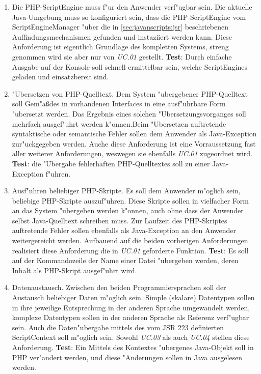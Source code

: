 \begin{enumerate}
\item Die PHP-ScriptEngine muss f"ur den Anwender verf"ugbar sein. Die aktuelle Java-Umgebung muss so konfiguriert sein,
    dass die PHP-ScriptEngine vom ScriptEngineManager "uber die in \ref{sec:javanscripts:jsr} beschriebenen Auffindungsmechanismen
    gefunden und instaziiert werden kann. Diese Anforderung ist eigentlich Grundlage des kompletten Systems, streng genommen wird sie
    aber nur von \emph{UC.01} gestellt.
    \textbf{Test}: Durch einfache Ausgabe auf der Konsole soll schnell ermittelbar sein, welche ScriptEngines geladen und einsatzbereit sind.

\item "Ubersetzen von PHP-Quelltext. Dem System "ubergebener PHP-Quelltext soll Gem"a\ss des in  vorhandenen 
    Interfaces  in eine ausf"uhrbare Form "ubersetzt werden. Das Ergebnis eines solchen "Ubersetzungsvorganges
    soll mehrfach ausgef"uhrt werden k"onnen.Beim "Ubersetzen auftretende syntaktische oder semantische Fehler sollen dem Anwender 
    als Java-Exception zur"uckgegeben werden.
    Auche diese Anforderung ist eine Vorraussetzung fast aller weiterer Anforderungen, weswegen sie ebenfalls \emph{UC.01} zugeordnet wird.
    \textbf{Test}: die "Ubergabe fehlerhaften PHP-Quelltextes soll zu einer Java-Exception f"uhren.

\item Ausf"uhren beliebiger PHP-Skripte. Es soll dem Anwender m"oglich sein, beliebige PHP-Skripte auszuf"uhren. Diese Skripte sollen
    in vielfacher Form an das System "ubergeben werden k"onnen, auch ohne dass der Anwender selbst Java-Quelltext schreiben muss.
    Zur Laufzeit des PHP-Skriptes auftretende Fehler sollen ebenfalls als Java-Exception an den Anwender weitergereicht werden.
    Aufbauend auf die beiden vorherigen Anforderungen realisiert diese Anforderung die in \emph{UC.01} geforderte Funktion.
    \textbf{Test}: Es soll auf der Kommandozeile der Name einer Datei "ubergeben werden, deren Inhalt als PHP-Skript ausgef"uhrt wird.

\item Datenaustausch. Zwischen den beiden Programmiersprachen soll der Austausch beliebiger Daten m"oglich sein. Simple (skalare)
    Datentypen sollen in ihre jeweilige Entsprechung in der anderen Sprache umgewandelt werden, komplexe Datentypen sollen in der anderen 
    Sprache als Referenz verf"ugbar sein. Auch die Daten"ubergabe mittels des vom JSR 223 definierten ScriptContext soll m"oglich sein.
    Sowohl \emph{UC.03} als auch \emph{UC.04} stellen diese Anforderung. 
    \textbf{Test}: Ein Mittels des Kontextes "ubergenes Java-Objekt soll in PHP ver"andert werden, und diese "Anderungen sollen in
    Java ausgelesen werden.


\end{enumerate}
